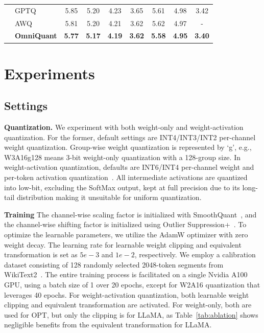 \documentclass{article} %
\begin{document}
\begin{table}[t]
\begin{tabular}{llccccccc}
         & GPTQ & 5.85 & 5.20 & 4.23 & 3.65 & 5.61 & 4.98 & 3.42 \\
         & AWQ & 5.81 & 5.20 & 4.21 & 3.62 & 5.62 & 4.97 & - \\
         & \cellcolor{Gray}\textbf{OmniQuant} & \cellcolor{Gray}\textbf{5.77} & \cellcolor{Gray}\textbf{5.17} & \cellcolor{Gray}\textbf{4.19} & \cellcolor{Gray}\textbf{3.62}& \cellcolor{Gray}\textbf{5.58} & \cellcolor{Gray}\textbf{4.95} & \cellcolor{Gray}\textbf{3.40}\\
        \hline
    \end{tabular}
    \label{tab:llama_weight_only}
    \vspace{-2em}
\end{table}


\section{Experiments}

\subsection{Settings}



\textbf{Quantization.}
We experiment with both weight-only and weight-activation quantization. For the former, default settings are INT4/INT3/INT2 per-channel weight quantization. Group-wise weight quantization is represented by `g', e.g., W3A16g128 means 3-bit weight-only quantization with a 128-group size. In weight-activation quantization, defaults are INT6/INT4 per-channel weight and per-token activation quantization~\citep{llmint8}. All intermediate activations are quantized into low-bit, excluding the SoftMax output, kept at full precision due to its long-tail distribution making it unsuitable for uniform quantization.

\textbf{Training} The channel-wise scaling factor is initialized with SmoothQuant~\citep{smoothquant}, and the channel-wise shifting factor is initialized using Outlier Suppression+~\citep{outlier-plus}.  To optimize the learnable parameters, we utilize the AdamW optimizer with zero weight decay. The learning rate for learnable weight clipping and equivalent transformation is set as $5e-3$ and $1e-2$, respectively. We employ a calibration dataset consisting of 128 randomly selected 2048-token segments from WikiText2~\citep{wikitext2}. The entire training process is facilitated on a single Nvidia A100 GPU, using a batch size of 1 over 20 epochs, except for W2A16 quantization that leverages 40 epochs. 
%
For weight-activation quantization, both learnable weight clipping and equivalent transformation are activated. For weight-only, both are used for OPT, but only the clipping is for LLaMA, as Table~\ref{tab:ablation} shows negligible benefits from the equivalent transformation for LLaMA.
\end{document}

